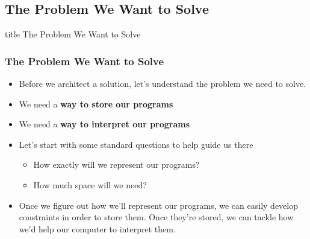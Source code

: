 \documentclass{beamer}
\begin{document}
    	\subsection{The Problem We Want to Solve}
    	
    	
    		\begin{frame}
                \vfill
                \centering
                \begin{beamercolorbox}[sep=8pt,center,shadow=true,rounded=true]{title}
                    The Problem We Want to Solve\par%
                \end{beamercolorbox}
                \vfill
             \end{frame}
    	
    		\begin{frame}
    			\frametitle{The Problem We Want to Solve}
    			\begin{itemize}
    				\item Before we architect a solution, let's understand the problem we need to solve.
    				\item We need a \textbf{way to store our programs}
    				\item We need a \textbf{way to interpret our programs}
    				\item Let's start with some standard questions to help guide us there
    				\begin{itemize}
    					\item How exactly will we represent our programs?
    					\item How much space will we need?
    				\end{itemize}
    				\item Once we figure out how we'll represent our programs, we can easily develop constraints in order to store them. Once they're stored, we can tackle how we'd help our computer to interpret them.
    			\end{itemize}
    		\end{frame}
    		
\end{document}
